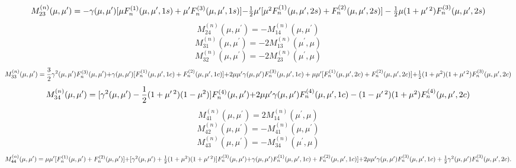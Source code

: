 \documentclass[12pt]{article}
\begin{document}
\begin{equation}
M_{23}^{(n)}(\mu, \mu^\prime)=-\gamma(\mu, \mu^\prime) \lbrack 
 \mu F_n^{(1)}(\mu, \mu^\prime, 1s)+\mu^\prime F_n^{(3)}(\mu, \mu^\prime, 1s) \rbrack
$$      $$
-{1\over 2} \mu^\prime \lbrack \mu^2  F_n^{(1)}(\mu, \mu^\prime, 2s)
 +F_n^{(2)}(\mu, \mu^\prime, 2s) \rbrack
-{1\over 2} \mu (1+ \mu^{\prime \> 2}) F_n^{(3)}(\mu, \mu^\prime, 2s)
\end{equation}
\begin{equation}
M_{24}^{(n)}(\mu, \mu^\prime)= -M_{14}^{(n)}(\mu, \mu^\prime)
\end{equation}
\begin{equation}
M_{31}^{(n)}(\mu, \mu^\prime)= -2 M_{13}^{(n)}(\mu^\prime, \mu)
\end{equation}
\begin{equation}
M_{32}^{(n)}(\mu, \mu^\prime)= -2 M_{23}^{(n)}(\mu^\prime, \mu)
\end{equation}
\begin{equation}
M_{33}^{(n)}(\mu, \mu^\prime)=
{3\over 2} \gamma^2(\mu, \mu^\prime)F_n^{(3)}(\mu, \mu^\prime)
$$    $$
+\gamma(\mu, \mu^\prime) \lbrack F_n^{(1)}(\mu, \mu^\prime,1c)+ F_n^{(2)}(\mu, \mu^\prime,1c) \rbrack 
$$      $$
+2 \mu \mu^\prime \gamma(\mu, \mu^\prime) F_n^{(3)}(\mu, \mu^\prime,1c)
+ \mu \mu^\prime \lbrack F_n^{(1)}(\mu, \mu^\prime,2c)+F_n^{(2)}(\mu, \mu^\prime,2c) \rbrack
$$      $$
 + {1\over 2} (1+\mu^2)(1+\mu^{\prime \> 2})F_n^{(3)}(\mu, \mu^\prime,2c)
\end{equation}
\begin{equation}
M_{34}^{(n)}(\mu, \mu^\prime)=
\lbrack \gamma^2(\mu, \mu^\prime)-{1\over2 }(1+\mu^{\prime \> 2})(1-\mu^2) \rbrack
F_n^{(4)}(\mu, \mu^\prime)
$$       $$
+2 \mu \mu^\prime \gamma(\mu, \mu^\prime) F_n^{(4)}(\mu, \mu^\prime,1c)
-(1-\mu^{\prime \> 2})(1+\mu^2)F_n^{(4)}(\mu, \mu^\prime,2c)
\end{equation}
\begin{equation}
M_{41}^{(n)}(\mu, \mu^\prime)= 2M_{14}^{(n)}(\mu^\prime, \mu)
\end{equation}
\begin{equation}
M_{42}^{(n)}(\mu, \mu^\prime)= -M_{41}^{(n)}(\mu, \mu^\prime)
\end{equation}
\begin{equation}
M_{43}^{(n)}(\mu, \mu^\prime)= - M_{34}^{(n)}(\mu^\prime, \mu)
\end{equation}
\begin{equation}
M_{44}^{(n)}(\mu, \mu^\prime)=
 \mu \mu^\prime \lbrack F_n^{(1)}(\mu, \mu^\prime)+ F_n^{(2)}(\mu, \mu^\prime) \rbrack
$$      $$
+ \lbrack  \gamma^2(\mu, \mu^\prime)+{1\over 2} (1+\mu^2)(1+\mu^{\prime \> 2}) \rbrack
 F_n^{(3)}(\mu, \mu^\prime) 
$$     $$
+\gamma(\mu, \mu^\prime) F_n^{(1)}(\mu, \mu^\prime,1c)
+F_n^{(2)}(\mu, \mu^\prime,1c) \rbrack 
$$     $$+2 \mu \mu^\prime \gamma(\mu, \mu^\prime)
  F_n^{(3)}(\mu, \mu^\prime,1c) +{1\over 2} \gamma^2(\mu, \mu^\prime) F_n^{(3)}(\mu, \mu^\prime,2c). 
\end{equation}
\end{document}
